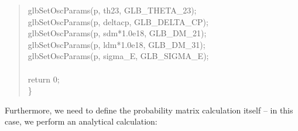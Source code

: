 \begin{quote}
{  \hspace*{0.5cm} glbSetOscParams(p, th23, GLB\_THETA\_23); \\
  \hspace*{0.5cm} glbSetOscParams(p, deltacp, GLB\_DELTA\_CP); \\
  \hspace*{0.5cm} glbSetOscParams(p, sdm*1.0e18, GLB\_DM\_21);   \\
  \hspace*{0.5cm} glbSetOscParams(p, ldm*1.0e18, GLB\_DM\_31);   \\
  \hspace*{0.5cm} glbSetOscParams(p, sigma\_E, GLB\_SIGMA\_E); \\
\\
  \hspace*{0.5cm} return 0; \\
\} 
}
\end{quote}
Furthermore, we need to define the probability matrix calculation itself -- in this case,
we perform an analytical calculation:
